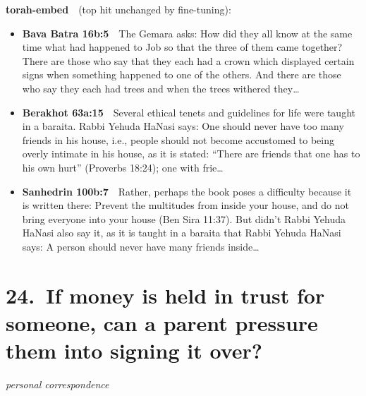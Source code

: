 \documentclass[11pt,a4paper]{article}
\begin{document}
{\color{quiet}\small\textbf{torah-embed}\ \ (top hit unchanged by fine-tuning):}
\begin{itemize}[leftmargin=1.2em,itemsep=3pt]
\item {\color{ref}\textbf{Bava Batra 16b:5}}\ \ The Gemara asks: How did they all know at the same time what had happened to Job so that the three of them came together? There are those who say that they each had a crown which displayed certain signs when something happened to one of the others. And there are those who say they each had trees and when the trees withered they\ldots
\item {\color{ref}\textbf{Berakhot 63a:15}}\ \ Several ethical tenets and guidelines for life were taught in a baraita. Rabbi Yehuda HaNasi says: One should never have too many friends in his house, i.e., people should not become accustomed to being overly intimate in his house, as it is stated: “There are friends that one has to his own hurt” (Proverbs 18:24); one with frie\ldots
\item {\color{ref}\textbf{Sanhedrin 100b:7}}\ \ Rather, perhaps the book poses a difficulty because it is written there: Prevent the multitudes from inside your house, and do not bring everyone into your house (Ben Sira 11:37). But didn’t Rabbi Yehuda HaNasi also say it, as it is taught in a baraita that Rabbi Yehuda HaNasi says: A person should never have many friends inside\ldots
\end{itemize}

\section*{24.\ If money is held in trust for someone, can a parent pressure them into signing it over?}
{\color{quiet}\small\textit{personal correspondence}}
\end{document}
